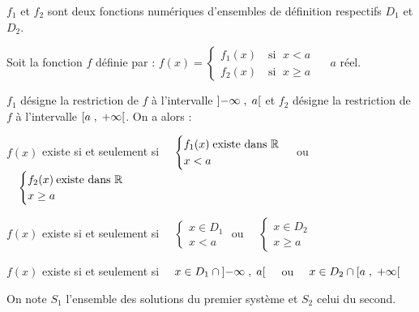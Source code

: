 
\everymath{\displaystyle}



   $ f_{1} $  et  $ f_{2} $ sont deux fonctions numériques d'ensembles de définition respectifs $ D_{1} $  et $ D_{2} $.

Soit la  fonction $ f $ définie par :  
 $f(x)=\begin{cases}
f_{1}(x)\quad \text{si }\; x<a\\
f_{2}(x)\quad \text{si }\; x\geq a
\end{cases}$  $\quad  a$  réel.
\medskip

 $ f_{1} $ désigne la restriction de $ f $ à l'intervalle $ \left]-\infty \;,\; a\right[ $ et $ f_{2} $ désigne la restriction de $ f $ à l'intervalle $ \left[a \;,\; +\infty\right[ $.  On a alors :
 
 \medskip
$ f(x) $ existe si et seulement si
  $\quad \begin{cases}
f_{1}(x)\; \text{existe  dans } \mathbb{R}\\
x<a   
\end{cases}$ 
ou  $\quad \begin{cases}
f_{2}(x)\: \text{existe  dans } \mathbb{R}\\
 x\geq a
\end{cases}$ 

\medskip
$ f(x) $ existe si et seulement si 
  $\quad \begin{cases}
x\in D_{1}\\
x<a   
\end{cases}$ 
ou  $\quad \begin{cases}
x\in D_{2}\\
 x\geq a
\end{cases}$ 
\medskip

$ f(x) $ existe si et seulement si  
  $\quad x\in D_{1}\cap \left]-\infty \;,\; a\right[\quad$  
ou  $\quad
x\in D_{2}\cap\left[a \;,\; +\infty\right[ $ 
\medskip

On note $S_{1} $ l'ensemble des solutions du premier système  et  $S_{2} $ celui du second.

